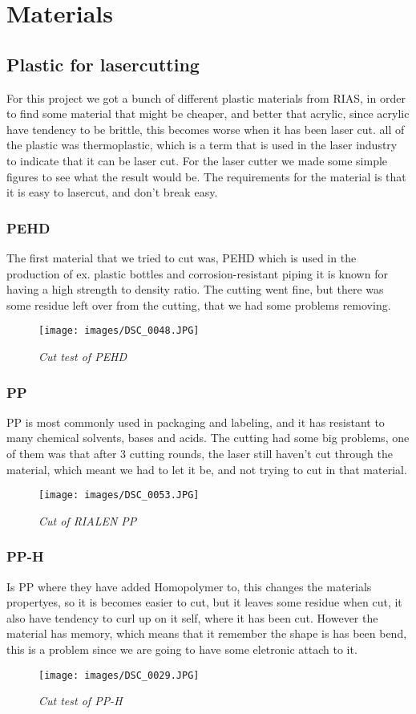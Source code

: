 \section{Materials}
\subsection{Plastic for lasercutting}
For this project we got a bunch of different plastic materials from RIAS, in order to find some material that might be cheaper, and better that acrylic, since acrylic have tendency to be brittle, this becomes worse when it has been laser cut.
all of the plastic was thermoplastic, which is a term that is used in the laser industry to indicate that it can be laser cut.
For the laser cutter we made some simple figures to see what the result would be.
The requirements for the material is that it is easy to lasercut, and don't break easy.
\subsubsection{PEHD}
The first material that we tried to cut was, PEHD which is used in the production of ex. plastic bottles and corrosion-resistant piping it is known for having a high strength to density ratio.
The cutting went fine, but there was some residue left over from the cutting, that we had some problems removing.
\begin{figure}[!h]
	\centering
	\texttt{[image: images/DSC\_0048.JPG]}
	\caption{\small {\it {Cut test of PEHD}}} \label{fig:explode}
\end{figure}
\FloatBarrier
\subsubsection{ PP}
 PP is most commonly used in packaging and labeling, and it has resistant to many chemical solvents, bases and acids.
The cutting had some big problems, one of them was that after 3 cutting rounds, the laser still haven't cut through the material, which meant we had to let it be, and not trying to cut in that material.
\begin{figure}[!h]
	\centering
	\texttt{[image: images/DSC\_0053.JPG]}
	\caption{\small {\it {Cut of RIALEN PP}}} \label{fig:explode}
\end{figure}
\FloatBarrier
\subsubsection{PP-H}
Is PP where they have added Homopolymer to, this changes the materials propertyes, so it is becomes easier to cut, but it leaves some residue when cut, it also have tendency to curl up on it self, where it has been cut.
However the material has memory, which means that it remember the shape is has been bend, this is a problem since we are going to have some eletronic attach to it.
\begin{figure}[!h]
	\centering
	\texttt{[image: images/DSC\_0029.JPG]}
	\caption{\small {\it {Cut test of PP-H}}} \label{fig:explode}
\end{figure}
\FloatBarrier
